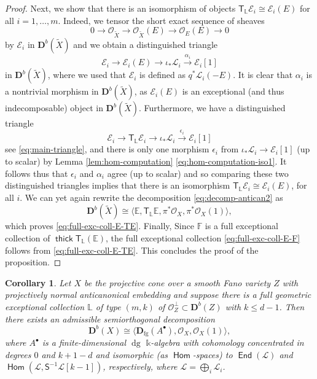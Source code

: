 \documentclass[a4paper,11pt, reqno]{amsart}
\def\E{\mathbb E}
\def\F{\mathbb F}
\def\L{\mathbb L}
\def\DD{\mathbf D}
\def\OO{\mathcal O}
\def\sE{\mathscr{E}}
\def\sL{\mathscr{L}}
\def\dg{{\operatorname{dg}}}
\newcommand{\opname}[1]{\operatorname{\mathsf{#1}}}
\newcommand{\Hom}{\opname{Hom}}
\newcommand{\End}{\opname{End}}
\newcommand{\thick}{\opname{thick}\nolimits}
\def\Db{\DD^b}
\newcommand{\bS}{\mathsf{S}}
\newcommand{\bT}{\mathsf{T}}
\theoremstyle{plain}
\newtheorem{corollary}[dummy]{Corollary}
\theoremstyle{definition}
\numberwithin{equation}{section}
\newlength{\arrow}
\begin{document}
\begin{proof}
Next, we show that there is an isomorphism of objects $\bT_\L  \sE_i  \cong \sE_i (E)$ for all $i = 1 , \ldots , m$.
Indeed, we tensor the short exact sequence of sheaves
\[
0 \to \OO_{\tilde{X}} \to \OO_{\tilde{X}} (E) \to \OO_E (E) \to 0 
\]
by $\sE_i$ in $\Db ( \tilde{X} )$ and we obtain a distinguished triangle
\[
\sE_i \to \sE_i (E) \to \iota_\ast \sL_i \xrightarrow{\alpha_i} \sE_i [1] 
\]
in $\Db ( \tilde{X} )$, where we used that $\sE_i $ is defined as $q^\ast \sL_i(-E)$.
It is clear that $\alpha_i $ is a nontrivial morphism in $\Db ( \tilde{X} )$, as $\sE_i (E)$ is an exceptional (and thus indecomposable) object in $\Db( \tilde{X} )$.
Furthermore, we have a distinguished triangle 
\[
\sE_i \to \bT_{\L} \sE_i  \to \iota_\ast \sL_i \xrightarrow{\epsilon_i } \sE_i [1]
\]
see \eqref{eq:main-triangle}, and there is only one morphism $\epsilon_i $ from $\iota_\ast \sL_i \to \sE_i [1]$ (up to scalar) by Lemma \ref{lem:hom-computation} \eqref{eq:hom-computation-iso1}.
It follows thus that $\epsilon_i $ and $\alpha_i $ agree (up to scalar) and so comparing these two distinguished triangles implies that there is an isomorphism $\bT_\L  \sE_i  \cong \sE_i (E)$, for all $i$.
We can yet again rewrite the decomposition \eqref{eq:decomp-antican2}
as
\begin{equation}\label{eq:exc-coll-E-TE}
    \Db( \tilde{X} ) \cong \langle \E , \bT_{\L} \E , \pi^\ast \OO_{X} , \pi^\ast\OO_{X} (1) \rangle ,
\end{equation}
which proves \eqref{eq:full-exc-coll-E-TE}. Finally,
Since $\F$ is a full exceptional collection of $\thick\bT_{\L} ( \E )$, the full exceptional collection \eqref{eq:full-exc-coll-E-F} follows from \eqref{eq:full-exc-coll-E-TE}. 
This concludes the proof of the proposition.
\end{proof}


\begin{corollary}\label{eq:projcone-absorption}
    Let $X$ be the projective cone over a smooth Fano variety $Z$ with projectively normal anticanonical embedding and suppose there is a full geometric exceptional collection $\L$ of type $(m,k)$
    of $ \OO_Z^\perp \subset\Db(Z)$ with $k \leq d-1$.
    Then there exists an admissible semiorthogonal decomposition 
    \[
    \Db (X) \cong \langle \DD_{\mathrm{fg}} ( A^\bullet  ) , \OO_X , \OO_X (1) \rangle , 
    \]
    where 
    $A^\bullet $ is a finite-dimensional $\dg$ $\mathbb{k}$-algebra with cohomology concentrated in degrees $0$ and $k+1-d$ and isomorphic (as $\Hom$-spaces) to $\End ( \sL )$ and $\Hom ( \sL , \bS^{-1} \sL [k-1] )$, respectively, where $\sL = \bigoplus_i \sL_i$.
\end{corollary}
\end{document}
